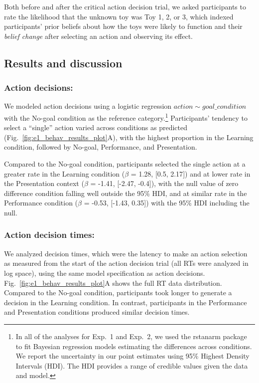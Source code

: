 \documentclass[10pt, letterpaper]{article}
\begin{document}
Both before and after the critical action decision trial, we asked
participants to rate the likelihood that the unknown toy was Toy 1, 2,
or 3, which indexed participants' prior beliefs about how the toys were
likely to function and their \emph{belief change} after selecting an
action and observing its effect.

\subsection{Results and discussion}\label{results-and-discussion}

\subsubsection{Action decisions:}\label{action-decisions}

We modeled action decisions using a logistic regression
\texttt{$action \sim goal\_condition$} with the No-goal condition as the
reference
category.\footnote{In all of the analyses for Exp.\ 1 and Exp.\ 2, we used the {\selectfont rstanarm} package to fit Bayesian regression models estimating the differences across conditions. We report the uncertainty in our point estimates using 95\% Highest Density Intervals (HDI). The HDI provides a range of credible values given the data and model.}
Participants' tendency to select a ``single'' action varied across
conditions as predicted (Fig.~\ref{fig:e1_behav_results_plot}A), with
the highest proportion in the Learning condition, followed by No-goal,
Performance, and Presentation.

Compared to the No-goal condition, participants selected the single
action at a greater rate in the Learning condition (\(\beta\) = 1.28,
{[}0.5, 2.17{]}) and at lower rate in the Presentation context
(\(\beta\) = -1.41, {[}-2.47, -0.4{]}), with the null value of zero
difference condition falling well outside the 95\% HDI, and at similar
rate in the Performance condition (\(\beta\) = -0.53, {[}-1.43, 0.35{]})
with the 95\% HDI including the null.

\subsubsection{Action decision times:}\label{action-decision-times}

We analyzed decision times, which were the latency to make an action
selection as measured from the start of the action decision trial (all
RTs were analyzed in log space), using the same model specification as
action decisions. Fig.~\ref{fig:e1_behav_results_plot}A shows the full
RT data distribution. Compared to the No-goal condition, participants
took longer to generate a decision in the Learning condition. In
contrast, participants in the Performance and Presentation conditions
produced similar decision times.
\end{document}
